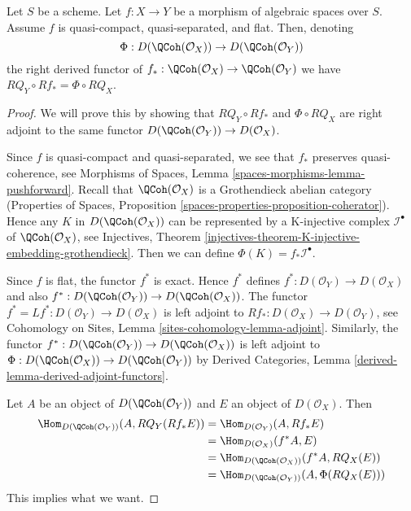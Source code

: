 \begin{lemma}
\label{lemma-flat-pushforward-coherator}
Let $S$ be a scheme. Let $f : X \to Y$ be a morphism of algebraic
spaces over $S$. Assume $f$ is quasi-compact, quasi-separated, and flat.
Then, denoting
$$
\Phi : D(\QCoh(\mathcal{O}_X)) \to D(\QCoh(\mathcal{O}_Y))
$$
the right derived functor of
$f_* : \QCoh(\mathcal{O}_X) \to \QCoh(\mathcal{O}_Y)$
we have $RQ_Y \circ Rf_* = \Phi \circ RQ_X$.
\end{lemma}

\begin{proof}
We will prove this by showing that $RQ_Y \circ Rf_*$ and $\Phi \circ RQ_X$
are right adjoint to the same functor
$D(\QCoh(\mathcal{O}_Y)) \to D(\mathcal{O}_X)$.

\medskip\noindent
Since $f$ is quasi-compact and quasi-separated, we see that
$f_*$ preserves quasi-coherence, see
Morphisms of Spaces, Lemma \ref{spaces-morphisms-lemma-pushforward}.
Recall that $\QCoh(\mathcal{O}_X)$ is a Grothendieck abelian category
(Properties of Spaces, Proposition
\ref{spaces-properties-proposition-coherator}).
Hence any $K$ in $D(\QCoh(\mathcal{O}_X))$
can be represented by a K-injective complex $\mathcal{I}^\bullet$
of $\QCoh(\mathcal{O}_X)$, see
Injectives, Theorem
\ref{injectives-theorem-K-injective-embedding-grothendieck}.
Then we can define $\Phi(K) = f_*\mathcal{I}^\bullet$.

\medskip\noindent
Since $f$ is flat, the functor $f^*$ is exact. Hence $f^*$ defines
$f^* : D(\mathcal{O}_Y) \to D(\mathcal{O}_X)$ and also
$f^* : D(\QCoh(\mathcal{O}_Y)) \to D(\QCoh(\mathcal{O}_X))$.
The functor $f^* = Lf^* : D(\mathcal{O}_Y) \to D(\mathcal{O}_X)$
is left adjoint to
$Rf_* : D(\mathcal{O}_X) \to D(\mathcal{O}_Y)$,
see Cohomology on Sites, Lemma \ref{sites-cohomology-lemma-adjoint}.
Similarly, the functor
$f^* : D(\QCoh(\mathcal{O}_Y)) \to D(\QCoh(\mathcal{O}_X))$
is left adjoint to
$\Phi : D(\QCoh(\mathcal{O}_X)) \to D(\QCoh(\mathcal{O}_Y))$
by Derived Categories, Lemma \ref{derived-lemma-derived-adjoint-functors}.

\medskip\noindent
Let $A$ be an object of $D(\QCoh(\mathcal{O}_Y))$ and
$E$ an object of $D(\mathcal{O}_X)$. Then
\begin{align*}
\Hom_{D(\QCoh(\mathcal{O}_Y))}(A, RQ_Y(Rf_*E))
& =
\Hom_{D(\mathcal{O}_Y)}(A, Rf_*E) \\
& =
\Hom_{D(\mathcal{O}_X)}(f^*A, E) \\
& =
\Hom_{D(\QCoh(\mathcal{O}_X))}(f^*A, RQ_X(E)) \\
& =
\Hom_{D(\QCoh(\mathcal{O}_Y))}(A, \Phi(RQ_X(E)))
\end{align*}
This implies what we want.
\end{proof}

